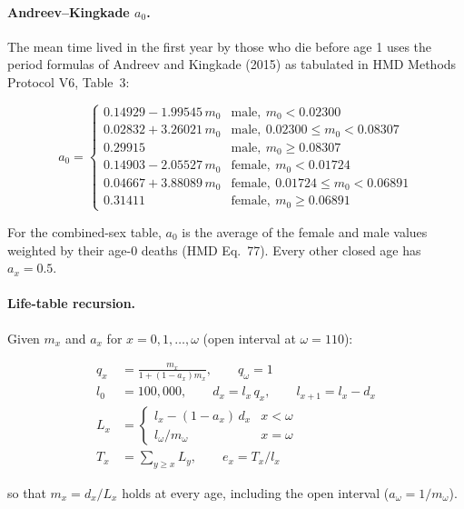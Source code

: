 \documentclass[11pt]{article}
\begin{document}
\paragraph{Andreev--Kingkade $a_0$.} The mean time lived in the first year
by those who die before age 1 uses the period formulas of Andreev and
Kingkade (2015) as tabulated in HMD Methods Protocol V6, Table~3:

\begin{equation}
a_0 =
\begin{cases}
0.14929 - 1.99545\,m_0 & \text{male}, \ m_0 < 0.02300 \\
0.02832 + 3.26021\,m_0 & \text{male}, \ 0.02300 \le m_0 < 0.08307 \\
0.29915 & \text{male}, \ m_0 \ge 0.08307 \\
0.14903 - 2.05527\,m_0 & \text{female}, \ m_0 < 0.01724 \\
0.04667 + 3.88089\,m_0 & \text{female}, \ 0.01724 \le m_0 < 0.06891 \\
0.31411 & \text{female}, \ m_0 \ge 0.06891
\end{cases}
\end{equation}

For the combined-sex table, $a_0$ is the average of the female and male
values weighted by their age-0 deaths (HMD Eq.~77). Every other closed age
has $a_x = 0.5$.

\paragraph{Life-table recursion.} Given $m_x$ and $a_x$ for $x = 0, 1,
\dots, \omega$ (open interval at $\omega = 110$):

\begin{align}
q_x &= \frac{m_x}{1 + (1-a_x)m_x}, \qquad q_\omega = 1 \\
l_0 &= 100{,}000, \qquad d_x = l_x\, q_x, \qquad l_{x+1} = l_x - d_x \\
L_x &=
\begin{cases}
l_x - (1-a_x)\, d_x & x < \omega \\
l_\omega / m_\omega & x = \omega
\end{cases}\\
T_x &= \sum_{y \geq x} L_y, \qquad e_x = T_x / l_x
\end{align}

so that $m_x = d_x / L_x$ holds at every age, including the open interval
($a_\omega = 1/m_\omega$).
\end{document}
